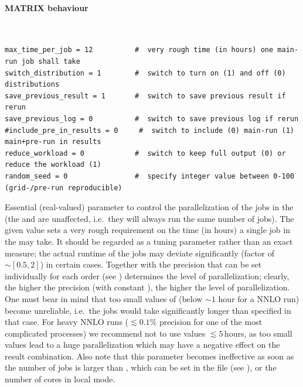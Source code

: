 \documentclass[english,11pt]{article}
\begin{document}
\paragraph{M{\footnotesize ATRIX} behaviour}

\lstset{basicstyle=\scriptsize, frame=single}
{\tt
\begin{lstlisting}
max_time_per_job = 12          #  very rough time (in hours) one main-run job shall take
switch_distribution = 1        #  switch to turn on (1) and off (0) distributions
save_previous_result = 1       #  switch to save previous result if rerun
save_previous_log = 0          #  switch to save previous log if rerun
#include_pre_in_results = 0     #  switch to include (0) main-run (1) main+pre-run in results
reduce_workload = 0            #  switch to keep full output (0) or reduce the workload (1)
random_seed = 0                #  specify integer value between 0-100 (grid-/pre-run reproducible)
\end{lstlisting}
}

\quad Essential (real-valued) parameter to control the parallelization 
of the jobs in the \mainrun{} (the \gridrun{} and \premainrun{} are unaffected, i.e.\ they will always run the same number of jobs). The given value sets a very rough requirement on the time (in hours) a 
single job in the \mainrun{} may take. It should be regarded as a tuning parameter rather than an 
exact measure; the actual runtime of the jobs may deviate significantly 
(factor of $\sim [0.5,2]$) in certain cases. Together with the precision that can be 
set individually for each order (see )  
determines the level of parallelization; clearly, the higher the precision (with constant 
), the higher the level of parallelization.
One must bear in mind that too small values of  (below $
\sim 1$ hour for a NNLO run) become unreliable, i.e.\ the jobs would take significantly longer
than specified in that case. For heavy NNLO runs 
($\lesssim 0.1\%$ precision for one of the most complicated processes) we recommend 
not to use values $\lesssim 5$\,hours, as too small values lead to a huge 
parallelization which may have a negative effect on the result combination.
Also note that this parameter becomes ineffective as soon as the number of jobs 
is larger than , which can be set in the file  (see ), or the number of cores 
in local mode. 
\end{document}
